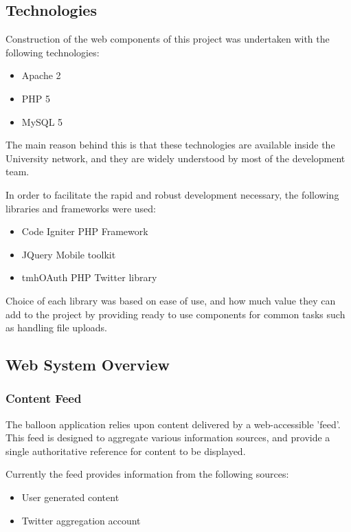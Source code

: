 \subsection{Technologies}

Construction of the web components of this project was undertaken with the following technologies:

\begin{itemize}
	\item Apache 2
	\item PHP 5
	\item MySQL 5
\end{itemize}

The main reason behind this is that these technologies are available inside the University network, and they are widely understood by most of the development team.

In order to facilitate the rapid and robust development necessary, the following libraries and frameworks were used:

\begin{itemize}
	\item Code Igniter PHP Framework
	\item JQuery Mobile toolkit
	\item tmhOAuth PHP Twitter library
\end{itemize}

Choice of each library was based on ease of use, and how much value they can add to the project by providing ready to use components for common tasks such as handling file uploads.

\subsection{Web System Overview}

\subsubsection{Content Feed}

The balloon application relies upon content delivered by a web-accessible 'feed'. This feed is designed to aggregate various information sources, and provide a single authoritative reference for content to be displayed.

Currently the feed provides information from the following sources:

\begin{itemize}
	\item User generated content
	\item Twitter aggregation account
\end{itemize}

